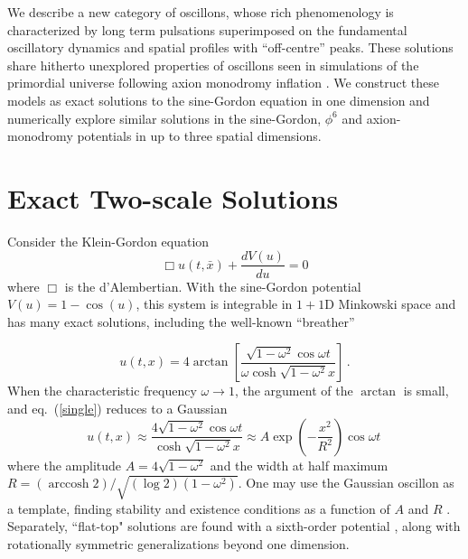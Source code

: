 \documentclass[%
reprint,
superscriptaddress,
amsmath,amssymb,
aps,
prd,
floatfix,
nofootinbib
]{revtex4-1}
\DeclareMathOperator{\arccosh}{arccosh}
\begin{document}

We describe a new category of oscillons, whose  rich phenomenology is characterized by long term pulsations superimposed on the fundamental oscillatory dynamics and spatial profiles with  ``off-centre'' peaks. These solutions share  hitherto unexplored properties of oscillons seen in simulations of the primordial universe following axion monodromy inflation \cite{stringInflationBook,Silverstein:2008sg,McAllister:2008hb,Flauger:2009ab,Amin:2010dc, Amin:2011hj}. We  construct these models as exact solutions to the sine-Gordon equation in one dimension and   numerically explore similar solutions in the sine-Gordon, $\phi^6$ and axion-monodromy potentials in up to three spatial dimensions. 
 
\section{Exact Two-scale Solutions}

Consider the Klein-Gordon equation
 \begin{equation}\label{kg}
 \Box u(t,\bar{x}) + \frac{ d V(u)}{du} = 0
 \end{equation}
where  $\Box$ is the d'Alembertian.  With the sine-Gordon potential $V(u) = 1-\cos(u)$,  this system is integrable in $1+1$D Minkowski space and has  many exact solutions,  including the well-known ``breather'' 

%
\begin{equation}\label{single}
  u(t,x) = 4 \arctan\left[ \frac{\sqrt{1-\omega^2} \cos \omega t}{\omega \cosh \sqrt{1-\omega^2} x} \right] \, .
\end{equation}
%
When the characteristic frequency $\omega\to1$, the argument of the $\arctan$ is small, and eq.~(\ref{single}) reduces to a Gaussian  
%
\begin{equation}
  u(t,x) \approx \frac{4\sqrt{1-\omega^2}\cos\omega t}{\cosh \sqrt{1-\omega^2} x} \approx A\exp\left(-\frac{x^2}{R^2}\right)\cos\omega t \,
\end{equation}
%
where the amplitude $A = 4\sqrt{1-\omega^2}$ and the width at half maximum $R=(\arccosh 2) /\sqrt{(\log 2)(1 - \omega^2)}$. One may use the Gaussian oscillon as a template, finding stability and existence conditions as a function of $A$ and $R$  \cite{Gleiser:2008ty}. Separately, ``flat-top" solutions are found with a sixth-order potential \cite{Amin:2010jq}, along with rotationally symmetric generalizations beyond one dimension. 
\end{document}
